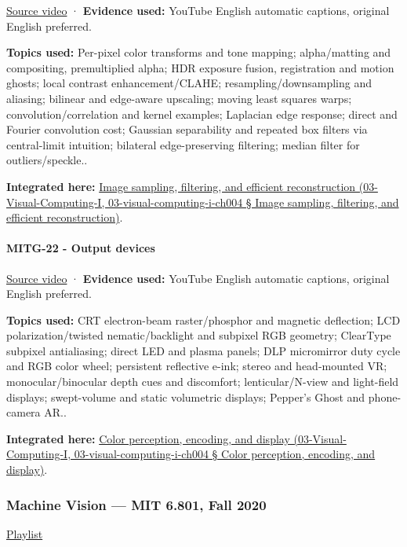 \href{https://www.youtube.com/watch?v=WWLxaVzkneI}{Source video} · \textbf{Evidence used:} YouTube English automatic captions, original English preferred.

\textbf{Topics used:} Per-pixel color transforms and tone mapping; alpha/matting and compositing, premultiplied alpha; HDR exposure fusion, registration and motion ghosts; local contrast enhancement/CLAHE; resampling/downsampling and aliasing; bilinear and edge-aware upscaling; moving least squares warps; convolution/correlation and kernel examples; Laplacian edge response; direct and Fourier convolution cost; Gaussian separability and repeated box filters via central-limit intuition; bilateral edge-preserving filtering; median filter for outliers/speckle..

\textbf{Integrated here:} \href{}{Image sampling, filtering, and efficient reconstruction (03-Visual-Computing-I, 03-visual-computing-i-ch004 § Image sampling, filtering, and efficient reconstruction)}.

\paragraph{MITG-22 - Output devices}\label{mitg-22---output-devices}

\href{https://www.youtube.com/watch?v=Z5693mG_iCE}{Source video} · \textbf{Evidence used:} YouTube English automatic captions, original English preferred.

\textbf{Topics used:} CRT electron-beam raster/phosphor and magnetic deflection; LCD polarization/twisted nematic/backlight and subpixel RGB geometry; ClearType subpixel antialiasing; direct LED and plasma panels; DLP micromirror duty cycle and RGB color wheel; persistent reflective e-ink; stereo and head-mounted VR; monocular/binocular depth cues and discomfort; lenticular/N-view and light-field displays; swept-volume and static volumetric displays; Pepper's Ghost and phone-camera AR..

\textbf{Integrated here:} \href{}{Color perception, encoding, and display (03-Visual-Computing-I, 03-visual-computing-i-ch004 § Color perception, encoding, and display)}.

\subsubsection{Machine Vision --- MIT 6.801, Fall 2020}\label{machine-vision-mit-6.801-fall-2020}

\href{https://www.youtube.com/playlist?list=PLUl4u3cNGP63pfpS1gV5P9tDxxL_e4W8O}{Playlist}

